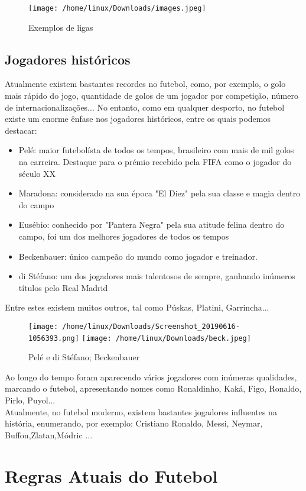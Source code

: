 \documentclass[a4paper,12pt]{report}
\begin{document}
\begin{figure}[!htp]
\centering 
\texttt{[image: /home/linux/Downloads/images.jpeg]}
\caption{Exemplos de ligas}
\end{figure}  
 
 \section{Jogadores históricos}
\label{Jogadores históricos}
Atualmente existem bastantes recordes no futebol, como, por exemplo, o golo mais rápido do jogo, quantidade de golos de um jogador por competição, número de internacionalizações... 
No entanto, como em qualquer desporto, no futebol existe um enorme ênfase nos jogadores históricos, entre os quais podemos destacar: 

\begin{itemize}
\item Pelé: maior futebolísta de todos os tempos, brasileiro com mais de mil golos na carreira. Destaque para o prémio recebido pela FIFA como o jogador do século XX
\item Maradona: considerado na sua época "El Diez" pela sua classe e magia dentro do campo
\item Eusébio: conhecido por "Pantera Negra" pela sua atitude felina dentro do campo, foi um dos melhores jogadores de todos os tempos
\item Beckenbauer: único campeão do mundo como jogador e treinador.
\item di Stéfano: um dos jogadores mais talentosos de sempre, ganhando inúmeros títulos pelo Real Madrid
\end{itemize}
Entre estes existem muitos outros, tal como Púskas, Platini, Garrincha...

\begin{figure}[!htp]
\centering 
\texttt{[image: /home/linux/Downloads/Screenshot\_20190616-1056393.png]}
\texttt{[image: /home/linux/Downloads/beck.jpeg]}
\caption{Pelé e di Stéfano; Beckenbauer}
\end{figure} 
Ao longo do tempo foram aparecendo vários jogadores com inúmeras qualidades, marcando o futebol, apresentando nomes como Ronaldinho, Kaká, Figo, Ronaldo, Pirlo, Puyol... \\
Atualmente, no futebol moderno, existem bastantes jogadores influentes na história, enumerando, por exemplo: Cristiano Ronaldo, Messi, Neymar, Buffon,Zlatan,Módric ... 

\chapter{Regras Atuais do Futebol}
\label{chap.Regras Atuais do Futebol}
\end{document}
